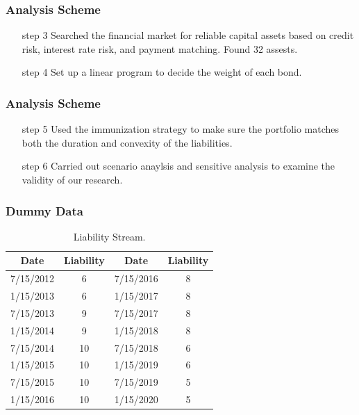 \documentclass[compress,handout,10pt]{beamer}
\let\olditem\item
\renewcommand{\item}{\setlength{\itemsep}{0.5\baselineskip}\olditem}
\begin{document}
\begin {frame}
\frametitle{Analysis Scheme}
\begin{enumerate}
    \item[step 3] Searched the financial market for reliable capital assets based on credit risk, interest rate risk, and payment matching. Found 32 assests.\\
  \vspace{5mm}
   \item[step 4] Set up a linear program to decide the weight of each bond.\\
\end{enumerate}
\end{frame}

\begin {frame}
\frametitle{Analysis Scheme}
\begin{enumerate}[step 1]

    \item[step 5] Used the immunization strategy to make sure the portfolio  matches both the duration and convexity of the liabilities.\\
\vspace{5mm}
    \item[step 6] Carried out scenario anaylsis and sensitive analysis to examine the validity of our research.
\end{enumerate}
\end{frame}


\begin{frame}
    \frametitle{Dummy Data}
\begin{table}[h]
\centering  
\begin{tabular}{cccc}
\hline
Date  &Liability  &Date  &Liability\\ \hline  
7/15/2012  &6  &7/15/2016  &8\\
1/15/2013  &6  &1/15/2017  &8\\ 
7/15/2013  &9  &7/15/2017  &8\\ 
1/15/2014  &9  &1/15/2018  &8\\ 
7/15/2014  &10 &7/15/2018  &6\\ 
1/15/2015  &10  &1/15/2019  &6\\ 
7/15/2015  &10  &7/15/2019  &5 \\ 
1/15/2016  &10  &1/15/2020  &5\\ \hline
\end{tabular}
\caption{Liability Stream.}
\end{table}
\end{frame}
\end{document}
